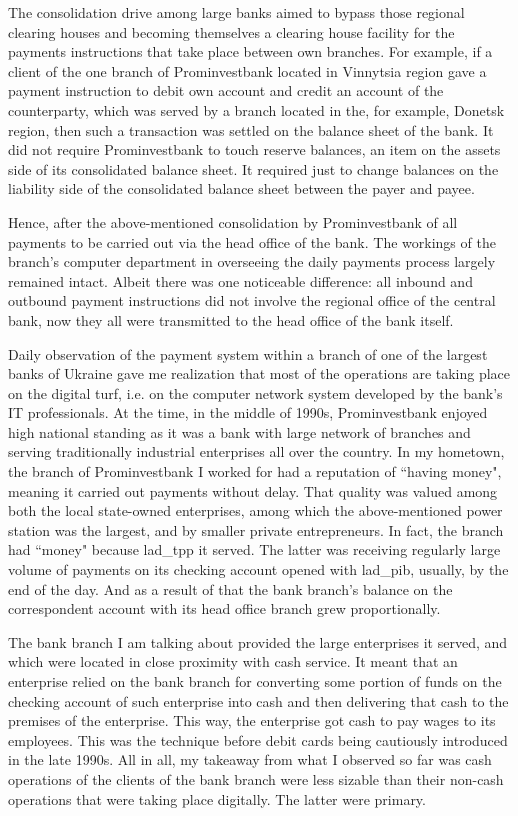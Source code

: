 The consolidation drive among large banks aimed to bypass those regional clearing houses and becoming themselves a clearing house facility for the payments instructions that take place between own branches. For example, if a client of the one branch of Prominvestbank located in Vinnytsia region gave a payment instruction to debit own account and credit an account of the counterparty, which was served by a branch located in the, for example, Donetsk region, then such a transaction was settled on the balance sheet of the bank. It did not require Prominvestbank to touch reserve balances, an item on the assets side of its consolidated balance sheet. It required just to change balances on the liability side of the consolidated balance sheet between the payer and payee.

Hence, after the above-mentioned consolidation by Prominvestbank of all payments to be carried out via the head office of the bank. The workings of the branch's computer department in overseeing the daily payments process largely remained intact. Albeit there was one noticeable difference: all inbound and outbound payment instructions did not involve the regional office of the central bank, now they all were transmitted to the head office of the bank itself.

Daily observation of the payment system within a branch of one of the largest banks of Ukraine gave me realization that most of the operations are taking place on the digital turf, i.e. on the computer network system developed by the bank's IT professionals. At the time, in the middle of 1990s, Prominvestbank enjoyed high national standing as it was a bank with large network of branches and serving traditionally industrial enterprises all over the country. In my hometown, the branch of Prominvestbank I worked for had a reputation of ``having money", meaning it carried out payments without delay. That quality was valued among both the local state-owned enterprises, among which the above-mentioned power station was the largest, and by smaller private entrepreneurs. In fact, the branch had ``money" because \ac{lad_tpp} it served. The latter was receiving regularly large volume of payments on its checking account opened with \ac{lad_pib}, usually, by the end of the day. And as a result of that the bank branch's balance on the correspondent account with its head office branch grew proportionally.

The bank branch I am talking about provided the large enterprises it served, and which were located in close proximity with cash service. It meant that an enterprise relied on the bank branch for converting some portion of funds on the checking account of such enterprise into cash and then delivering that cash to the premises of the enterprise. This way, the enterprise got cash to pay wages to its employees. This was the technique before debit cards being cautiously introduced in the late 1990s. All in all, my takeaway from what I observed so far was cash operations of the clients of the bank branch were less sizable than their non-cash operations that were taking place digitally. The latter were primary. 

